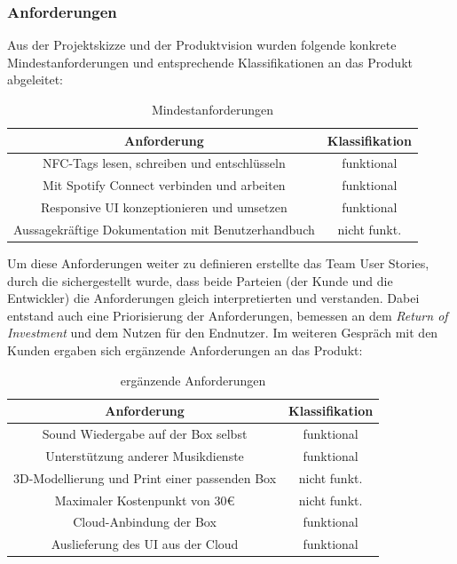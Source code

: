 \documentclass[10pt, a4paper]{article}
\begin{document}
\begin{onehalfspace}
\subsubsection{Anforderungen}
Aus der Projektskizze und der Produktvision wurden folgende konkrete Mindestanforderungen und entsprechende Klassifikationen an das Produkt abgeleitet:
\begin{center}
  \begin{table}[h!]
    \begin{tabular}{c|c}
      Anforderung & Klassifikation\\
      \hline
      NFC-Tags lesen, schreiben und entschlüsseln & funktional  \\
      Mit Spotify Connect verbinden und arbeiten & funktional \\
      Responsive UI konzeptionieren und umsetzen & funktional  \\
      Aussagekräftige Dokumentation mit Benutzerhandbuch & nicht funkt.  \\
    \end{tabular}
    \caption{\label{mind-anforderungen}Mindestanforderungen}
\end{table}
\end{center}

Um diese Anforderungen weiter zu definieren erstellte das Team User Stories,
durch die sichergestellt wurde, dass beide Parteien (der Kunde und die Entwickler) die Anforderungen  gleich interpretierten und verstanden.
Dabei entstand auch eine Priorisierung der Anforderungen, bemessen an dem \textit{Return of Investment} und dem Nutzen für den Endnutzer.
Im weiteren Gespräch mit den Kunden ergaben sich ergänzende Anforderungen an das Produkt:
\begin{center}
  \begin{table}[h!]
    \begin{tabular}{c|c}
    Anforderung & Klassifikation \\
    \hline
    Sound Wiedergabe auf der Box selbst & funktional  \\
    Unterstützung anderer Musikdienste & funktional \\
    3D-Modellierung und Print einer passenden Box & nicht funkt.  \\
    Maximaler Kostenpunkt von 30€ & nicht funkt.  \\
    Cloud-Anbindung der Box & funktional \\
    Auslieferung des UI aus der Cloud & funktional \\
    \end{tabular}
    \caption{\label{erg-anforderungen}ergänzende Anforderungen}
  \end{table}
\end{center}


\end{onehalfspace}
\end{document}
